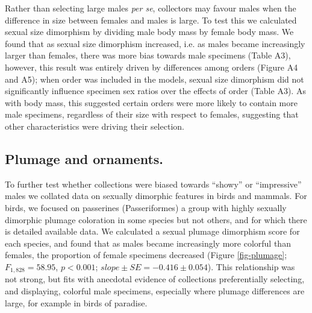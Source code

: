 \documentclass[a4paper, 12pt]{article}
\begin{document}
Rather than selecting large males \textit{per se}, collectors may favour males when the difference in size between females and males is large. 
To test this we calculated sexual size dimorphism by dividing male body mass by female body mass. 
We found that as sexual size dimorphism increased, i.e. as males became increasingly larger than females, there was more bias towards male specimens (Table A3), however, this result was entirely driven by differences among orders (Figure A4 and A5); when order was included in the models, sexual size dimorphism did not significantly influence specimen sex ratios over the effects of order (Table A3). 
As with body mass, this suggested certain orders were more likely to contain more male specimens, regardless of their size with respect to females, suggesting that other characteristics were driving their selection.

\subsection{Plumage and ornaments.} 
To further test whether collections were biased towards ``showy'' or ``impressive'' males we collated data on sexually dimorphic features in birds and mammals. 
For birds, we focused on passerines (Passeriformes) a group with highly sexually dimorphic plumage coloration in some species but not others, and for which there is detailed available data\cite{dale2015data,dale2015effects}. 
We calculated a sexual plumage dimorphism score for each species, and found that as males became increasingly more colorful than females, the proportion of female specimens decreased (Figure \ref{fig-plumage}; $F_{1, 828} = 58.95$, $p < 0.001$; $slope \pm SE = -0.416 \pm 0.054$). 
This relationship was not strong, but fits with anecdotal evidence of collections preferentially selecting, and displaying\cite{machin2008}, colorful male specimens, especially where plumage differences are large, for example in birds of paradise. 
\end{document}
